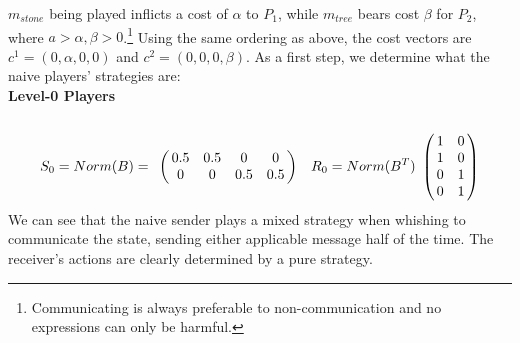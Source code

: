 \documentclass[10pt]{article}
\begin{document}
$m_{stone}$ being played inflicts a cost of $\alpha$ to $P_1$, while $m_{tree}$ bears cost $\beta$ for $P_2$, where $a>\alpha,\beta>0$.\footnote{Communicating is always preferable to non-communication and no expressions can only be harmful.} Using the same ordering as above, the cost vectors are $c^1=(0,\alpha,0,0)$ and $c^2=(0,0,0,\beta)$. As a first step, we determine what the naive players' strategies are:\\
\textbf{Level-0 Players}\\
\begin{equation*}
S_0=Norm(B)=
\bordermatrix{
            & & & &    \cr
 &       0.5 &         0.5 & 0       & 0 \cr
 &       0 &         0 & 0.5       & 0.5
 }\quad
R_0=Norm(B^T)
\bordermatrix{
            &  & \cr
    & 1 & 0 \cr
     & 1 & 0 \cr
     & 0 & 1 \cr
     & 0 & 1 \cr
 }
\end{equation*}
We can see that the naive sender plays a mixed strategy when whishing to communicate the state, sending either applicable message half of the time. The receiver's actions are clearly determined by a pure strategy.
\end{document}
